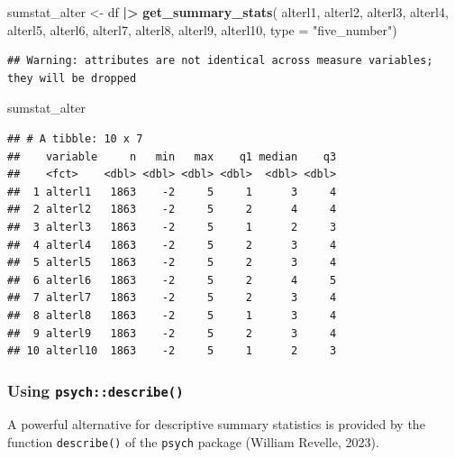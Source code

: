 \documentclass[
  doc]{apa6}
\newenvironment{Shaded}{\begin{snugshade}}{\end{snugshade}}
\newcommand{\AttributeTok}[1]{\textcolor[rgb]{0.13,0.29,0.53}{#1}}
\newcommand{\FunctionTok}[1]{\textcolor[rgb]{0.13,0.29,0.53}{\textbf{#1}}}
\newcommand{\NormalTok}[1]{#1}
\newcommand{\OtherTok}[1]{\textcolor[rgb]{0.56,0.35,0.01}{#1}}
\newcommand{\SpecialCharTok}[1]{\textcolor[rgb]{0.81,0.36,0.00}{\textbf{#1}}}
\newcommand{\StringTok}[1]{\textcolor[rgb]{0.31,0.60,0.02}{#1}}
\begin{document}
\begin{Shaded}
\begin{Highlighting}[]
\NormalTok{sumstat\_alter }\OtherTok{\textless{}{-}}\NormalTok{ df }\SpecialCharTok{|\textgreater{}} 
  \FunctionTok{get\_summary\_stats}\NormalTok{(}
\NormalTok{    alterl1, }
\NormalTok{    alterl2, }
\NormalTok{    alterl3, }
\NormalTok{    alterl4, }
\NormalTok{    alterl5, }
\NormalTok{    alterl6, }
\NormalTok{    alterl7, }
\NormalTok{    alterl8, }
\NormalTok{    alterl9, }
\NormalTok{    alterl10,  }
    \AttributeTok{type =} \StringTok{"five\_number"}\NormalTok{)  }
\end{Highlighting}
\end{Shaded}

\begin{verbatim}
## Warning: attributes are not identical across measure variables; they will be dropped
\end{verbatim}

\begin{Shaded}
\begin{Highlighting}[]
\NormalTok{sumstat\_alter}
\end{Highlighting}
\end{Shaded}

\begin{verbatim}
## # A tibble: 10 x 7
##    variable     n   min   max    q1 median    q3
##    <fct>    <dbl> <dbl> <dbl> <dbl>  <dbl> <dbl>
##  1 alterl1   1863    -2     5     1      3     4
##  2 alterl2   1863    -2     5     2      4     4
##  3 alterl3   1863    -2     5     1      2     3
##  4 alterl4   1863    -2     5     2      3     4
##  5 alterl5   1863    -2     5     2      3     4
##  6 alterl6   1863    -2     5     2      4     5
##  7 alterl7   1863    -2     5     2      3     4
##  8 alterl8   1863    -2     5     1      3     4
##  9 alterl9   1863    -2     5     2      3     4
## 10 alterl10  1863    -2     5     1      2     3
\end{verbatim}

\hypertarget{using-psychdescribe}{%
\subsubsection{\texorpdfstring{Using \texttt{psych::describe()}}{Using psych::describe()}}\label{using-psychdescribe}}

A powerful alternative for descriptive summary statistics is provided by the function \texttt{describe()} of the \texttt{psych} package (William Revelle, 2023).
\end{document}

